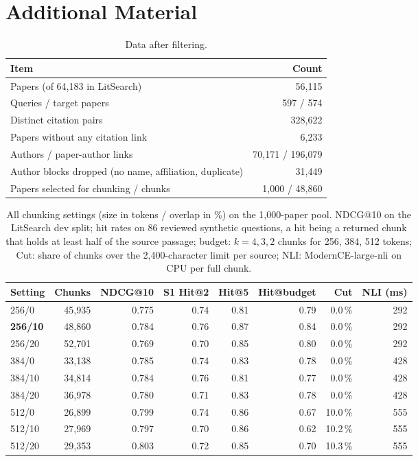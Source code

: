 \section{Additional Material}
\label{sec:appendix}

\begin{table}[ht]
\centering
\caption{Data after filtering.}
\label{tab:data}
\small
\begin{tabular}{lr}
\toprule
Item & Count \\
\midrule
Papers (of 64{,}183 in LitSearch) & 56{,}115 \\
Queries / target papers & 597 / 574 \\
Distinct citation pairs & 328{,}622 \\
Papers without any citation link & 6{,}233 \\
Authors / paper-author links & 70{,}171 / 196{,}079 \\
Author blocks dropped (no name, affiliation, duplicate) & 31{,}449 \\
Papers selected for chunking / chunks & 1{,}000 / 48{,}860 \\
\bottomrule
\end{tabular}
\end{table}

\begin{table}[ht]
\centering
\caption{All chunking settings (size in tokens / overlap in \%) on the 1{,}000-paper pool. NDCG@10 on the LitSearch dev split; hit rates on 86 reviewed synthetic questions, a hit being a returned chunk that holds at least half of the source passage; budget: $k = 4, 3, 2$ chunks for 256, 384, 512 tokens; Cut: share of chunks over the 2{,}400-character limit per source; NLI: ModernCE-large-nli on CPU per full chunk.}
\label{tab:chunking}
\small
\begin{tabular}{lrrrrrrr}
\toprule
Setting & Chunks & NDCG@10 & S1 Hit@2 & Hit@5 & Hit@budget & Cut & NLI (ms) \\
\midrule
256/0  & 45{,}935 & 0.775 & 0.74 & 0.81 & 0.79 & 0.0\,\% & 292 \\
\textbf{256/10} & 48{,}860 & 0.784 & 0.76 & 0.87 & 0.84 & 0.0\,\% & 292 \\
256/20 & 52{,}701 & 0.769 & 0.70 & 0.85 & 0.80 & 0.0\,\% & 292 \\
384/0  & 33{,}138 & 0.785 & 0.74 & 0.83 & 0.78 & 0.0\,\% & 428 \\
384/10 & 34{,}814 & 0.784 & 0.76 & 0.81 & 0.77 & 0.0\,\% & 428 \\
384/20 & 36{,}978 & 0.780 & 0.71 & 0.83 & 0.78 & 0.0\,\% & 428 \\
512/0  & 26{,}899 & 0.799 & 0.74 & 0.86 & 0.67 & 10.0\,\% & 555 \\
512/10 & 27{,}969 & 0.797 & 0.70 & 0.86 & 0.62 & 10.2\,\% & 555 \\
512/20 & 29{,}353 & 0.803 & 0.72 & 0.85 & 0.70 & 10.3\,\% & 555 \\
\bottomrule
\end{tabular}
\end{table}

